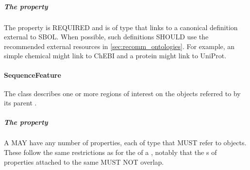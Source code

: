 \subparagraph{The  property}\label{sec:definition:ER}

The  property is REQUIRED and is of type  that links to a canonical definition external to SBOL.
When possible, such definitions SHOULD use the recommended external resources in \ref{sec:recomm_ontologies}.
For example, an  simple chemical might link to ChEBI and a protein might link to UniProt.


\paragraph{SequenceFeature}
\label{sec:SequenceFeature}

The  class describes one or more regions of interest on the  objects referred to by its parent . 

\subparagraph{The  property}\label{sec:hasLocation:SF}

A  MAY have any number of  properties, each of type  that MUST refer to  objects. 
These follow the same restrictions as for the  of a , notably that the s of  properties attached to the same  MUST NOT overlap.


